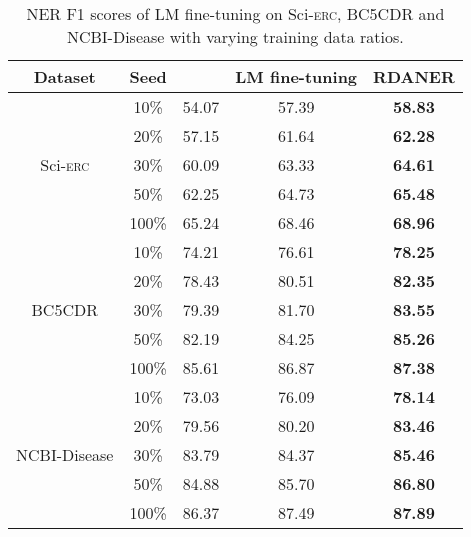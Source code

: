 \documentclass[10pt, conference, compsocconf]{IEEEtran}
\newcommand{\Scierc}{\textsc{S}ci-\textsc{erc}\xspace}
\newcommand{\rdaner}{\textsc{RDANER}\xspace}
\newcommand{\bertbase}{\xspace}
\begin{document}
\begin{table}
    \caption{NER F1 scores of LM fine-tuning  on \Scierc, BC5CDR and NCBI-Disease with 
    varying training data ratios. 
}\label{tal:results}
    \centering


    \begin{tabular}{c|c|ccc}
        \toprule
    Dataset      &  Seed  &       \bertbase & LM fine-tuning & \rdaner    \\ \hline
    \multirow{5}{*}{\Scierc}       & 10\%         & 54.07           & 57.39          & \textbf{58.83} \\
                                  & 20\%          & 57.15        & 61.64          & \textbf{62.28} \\
                                  & 30\%          & 60.09        & 63.33          & \textbf{64.61}          \\
                                  & 50\%          & 62.25        & 64.73          & \textbf{65.48}          \\
                                  & 100\%         & 65.24      & 68.46          & \textbf{68.96} \\ \hline
    \multirow{5}{*}{BC5CDR}       & 10\%          & 74.21     & 76.61          & \textbf{78.25}          \\
                                  & 20\%          & 78.43     & 80.51          & \textbf{82.35}          \\
                                  & 30\%          & 79.39      & 81.70          & \textbf{83.55}          \\
                                  & 50\%          & 82.19        & 84.25          & \textbf{85.26}          \\
                                  & 100\%         & 85.61                & 86.87          & \textbf{87.38}          \\ \hline
    \multirow{5}{*}{NCBI-Disease} & 10\%          & 73.03      & 76.09          & \textbf{78.14}          \\
                                  & 20\%          & 79.56       & 80.20          & \textbf{83.46}          \\
                                  & 30\%          & 83.79     & 84.37          & \textbf{85.46}          \\
                                  & 50\%          & 84.88     & 85.70          & \textbf{86.80}          \\
                                  & 100\%         & 86.37      & 87.49          & \textbf{87.89}          \\ 
    \bottomrule
    \end{tabular}
    \end{table}
\end{document}
